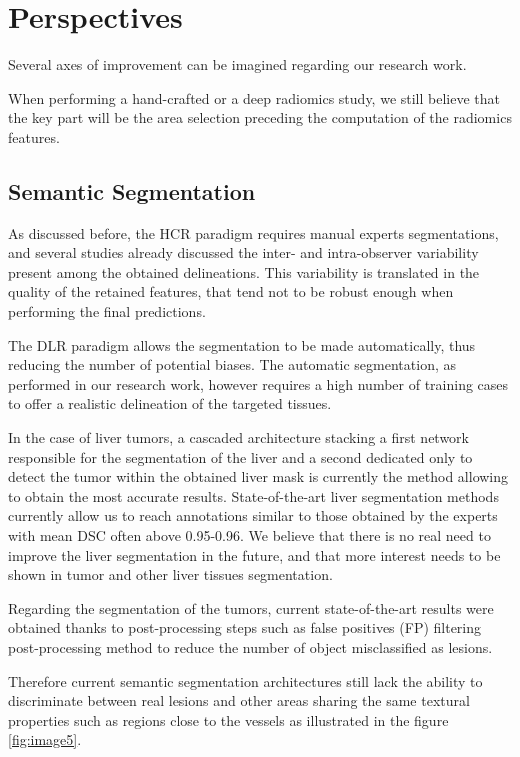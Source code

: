 \chapter{Perspectives}

Several axes of improvement can be imagined regarding our research work.

When performing a hand-crafted or a deep radiomics study, we still
believe that the key part will be the area selection preceding the
computation of the radiomics features.

\section{Semantic Segmentation}

As discussed before, the HCR paradigm requires manual experts
segmentations, and several studies already discussed the inter- and
intra-observer variability present among the obtained delineations. This
variability is translated in the quality of the retained features, that
tend not to be robust enough when performing the final predictions.

The DLR paradigm allows the segmentation to be made automatically, thus
reducing the number of potential biases. The automatic segmentation, as
performed in our research work, however requires a high number of
training cases to offer a realistic delineation of the targeted tissues.

In the case of liver tumors, a cascaded architecture stacking a first
network responsible for the segmentation of the liver and a second
dedicated only to detect the tumor within the obtained liver mask is
currently the method allowing to obtain the most accurate results.
State-of-the-art liver segmentation methods currently allow us to reach
annotations similar to those obtained by the experts with mean DSC often
above 0.95-0.96. We believe that there is no real need to improve the
liver segmentation in the future, and that more interest needs to be
shown in tumor and other liver tissues segmentation.

Regarding the segmentation of the tumors, current state-of-the-art
results were obtained thanks to post-processing steps such as false
positives (FP) filtering post-processing method to reduce the number of
object misclassified as lesions.

Therefore current semantic segmentation architectures still lack the
ability to discriminate between real lesions and other areas sharing the
same textural properties such as regions close to the vessels as
illustrated in the figure \ref{fig:image5}.



